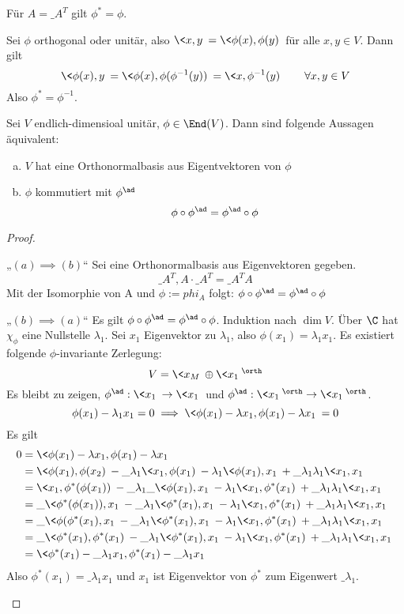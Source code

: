 \documentclass{mycourse}
\begin{document}
\begin{ex}
	Für $A=\_A^T$ gilt $\phi^* = \phi$.

	Sei $\phi$ orthogonal oder unitär, also $\<x,y\> = \<\phi(x),\phi(y)\>$ für alle $x,y\in V$.
	Dann gilt
	\[
		\<\phi(x),y\> = \<\phi(x),\phi(\phi^{-1}(y))\> = \<x, \phi^{-1}(y)\> \qquad \forall x,y\in V
	\]
	Also $\phi^* = \phi^{-1}$.
\end{ex}

\begin{thm}
	\label{thm:13.25}
	Sei $V$ endlich-dimensioal unitär, $\phi\in \End(V)$.
	Dann sind folgende Aussagen äquivalent:
	\begin{enumerate}[(a)]
		\item
			$V$ hat eine Orthonormalbasis aus Eigentvektoren von $\phi$
		\item
			$\phi$ kommutiert mit $\phi^{\ad}$
			\[
				\phi \circ \phi^{\ad} = \phi^{\ad} \circ \phi
			\]
	\end{enumerate}
	\begin{proof}
		\begin{seg}{„$(a)\implies (b)$“}
			Sei eine Orthonormalbasis aus Eigenvektoren gegeben.
			\[
				\_A^T, A\cdot \_A^T = \_A^T A
			\]
			Mit der Isomorphie von A und $\phi:=phi_A$ folgt: $\phi\circ \phi^{\ad} = \phi^{\ad}\circ \phi$
		\end{seg}
		\begin{seg}{„$(b)\implies (a)$“}
			Es gilt $\phi \circ \phi^{\ad} = \phi^{\ad}\circ \phi$.
			Induktion nach $\dim V$.
			Über $\C$ hat $\chi_\phi$ eine Nullstelle $\lambda_1$.
			Sei $x_1$ Eigenvektor zu $\lambda_1$, also $\phi(x_1) = \lambda_1 x_1$.
			Es existiert folgende $\phi$-invariante Zerlegung:
			\[
				V = \<x_M\>  \oplus \<x_1\>^\orth
			\]
			Es bleibt zu zeigen, $\phi^{\ad}: \<x_1\> \to \<x_1\>$ und $\phi^{\ad}: \<x_1\>^\orth \to \<x_1\>^\orth$.
			\[
				\phi(x_1) -\lambda_1 x_1 = 0 \implies \<\phi(x_1)-\lambda x_1, \phi(x_1) - \lambda x_1\> = 0
			\]
			Es gilt
			\begin{align*}
				0 &= \<\phi(x_1)-\lambda x_1, \phi(x_1) - \lambda x_1\> \\
				  &= \<\phi(x_1),\phi(x_2)\> - \_\lambda_1 \<x_1,\phi(x_1)\> - \lambda_1 \<\phi(x_1), x_1\> + \_\lambda_1\lambda_1\<x_1,x_1\>\\
				  &= \<x_1,\phi^*(\phi(x_1))\> - \_\lambda_1\_{\<\phi(x_1),x_1\>} - \lambda_1\<x_1,\phi^*(x_1)\> + \_\lambda_1\lambda_1 \<x_1,x_1\>\\
				  &= \_{\<\phi^*(\phi(x_1)),x_1\>} - \_\lambda_1 \<\phi^*(x_1),x_1\> - \lambda_1\<x_1,\phi^*(x_1)\> + \_\lambda_1\lambda_1 \<x_1,x_1\>\\
				  &= \_{\<\phi(\phi^*(x_1),x_1\>} - \_\lambda_1\<\phi^*(x_1),x_1\> - \lambda_1\<x_1,\phi^*(x_1)\> + \_\lambda_1\lambda_1\<x_1,x_1\>\\
				  &= \_{\<\phi^*(x_1),\phi^*(x_1)\>} - \_\lambda_1 \<\phi^*(x_1),x_1\> - \lambda_1 \<x_1,\phi^*(x_1)\> + \_\lambda_1\lambda_1 \<x_1,x_1\>\\
				  &= \<\phi^*(x_1)-\_\lambda_1x_1, \phi^*(x_1)-\_\lambda_1x_1\>
			\end{align*}
			Also $\phi^*(x_1) = \_\lambda_1 x_1$ und $x_1$ ist Eigenvektor von $\phi^*$ zum Eigenwert $\_\lambda_1$.


\end{seg}
\end{proof}
\end{thm}
\end{document}
